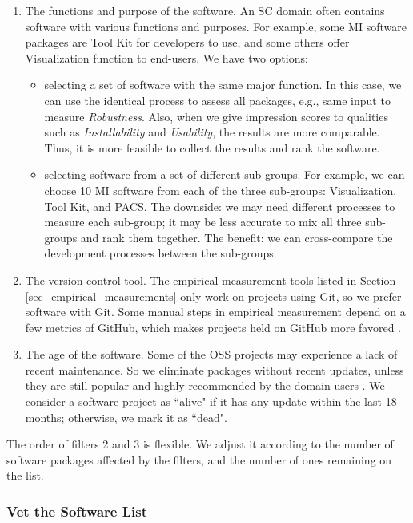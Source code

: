 \documentclass[3p, 12pt,authoryear]{elsarticle}
\begin{document}
\begin{enumerate}
\item The functions and purpose of the software. An SC domain often contains
software with various functions and purposes. For example, some MI software
packages are Tool Kit for developers to use, and some others offer Visualization
function to end-users. We have two options:
\begin{itemize}
\item selecting a set of software with the same major function. In this case, we
can use the identical process to assess all packages, e.g., same input to
measure \textit{Robustness}. Also, when we give impression scores to qualities
such as \textit{Installability} and \textit{Usability}, the results are more
comparable. Thus, it is more feasible to collect the results and rank the
software.
\item selecting software from a set of different sub-groups. For example, we can
choose 10 MI software from each of the three sub-groups: Visualization, Tool
Kit, and PACS. The downside: we may need different processes to measure each
sub-group; it may be less accurate to mix all three sub-groups and rank them
together. The benefit: we can cross-compare the development processes between
the sub-groups.
\end{itemize}

\item The version control tool. The empirical measurement tools listed in
Section \ref{sec_empirical_measurements} only work on projects using
\hyperlink{https://git-scm.com/}{Git}, so we prefer software with Git. Some
manual steps in empirical measurement depend on a few metrics of GitHub, which
makes projects held on GitHub more favored \citep{SmithEtAl2021}.

\item The age of the software. Some of the OSS projects may experience a lack of
recent maintenance. So we eliminate packages without recent updates, unless they
are still popular and highly recommended by the domain users
\citep{SmithEtAl2021}. We consider a software project as ``alive" if it has any
update within the last 18 months; otherwise, we mark it as ``dead".
\end{enumerate}

The order of filters 2 and 3 is flexible. We adjust it according to the number
of software packages affected by the filters, and the number of ones remaining
on the list.

\subsubsection{Vet the Software List} \label{sec_vet_software_list}
\end{document}
